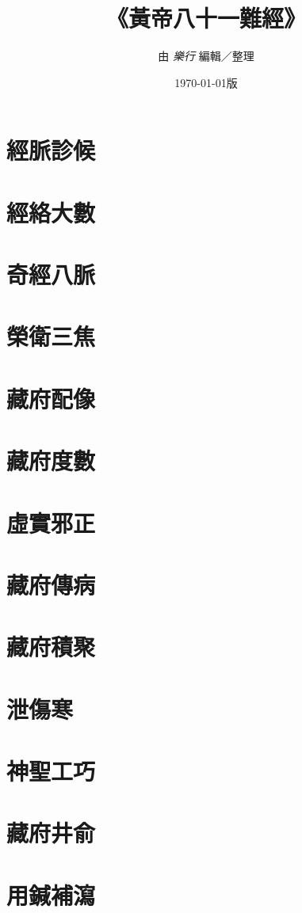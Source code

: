 \documentclass[UTF8, nofont, landscape]{ctexbook} %
\title{\zihao{0}\textbf{《黃帝八十一難經》}}
\author{\normalsize 由 \textit{樂行} 編輯／整理}
\date{\normalsize\today 版}
\begin{document}
\maketitle
\tableofcontents

\part{經脈診候}
\LARGE


\part{經絡大數}
\LARGE


\part{奇經八脈}
\LARGE


\part{榮衛三焦}
\LARGE


\part{藏府配像}
\LARGE


\part{藏府度數}
\LARGE


\part{虛實邪正}
\LARGE


\part{藏府傳病}
\LARGE


\part{藏府積聚}
\LARGE


\part{泄傷寒}
\LARGE


\part{神聖工巧}
\LARGE


\part{藏府井俞}
\LARGE


\part{用鍼補瀉}
\LARGE

\end{document}

